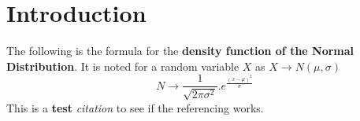 \section{\bf{Introduction}}

The following is the formula for the \textbf{density function of the Normal Distribution}.  It is noted for a random variable $X$ as $X\rightarrow N(\mu,\sigma)$
$$ N\rightarrow\frac{1}{\sqrt{2\pi\sigma^2}}.e^{\frac{(x-\mu)^2}{\sigma}}$$
This is a \textbf{test} \textit{citation}\cite{NIPS2019_8688} to see if the referencing works.